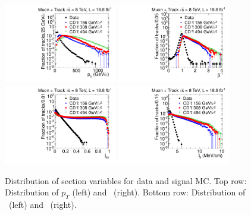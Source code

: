 \begin{figure}
\centering
  \includegraphics[clip=true, trim=0.0cm 0cm 2.8cm 0cm, width=0.44\textwidth]{figures/tkmu/Selection_Comp_8TeV_GMStau_Pt_BS}
  \includegraphics[clip=true, trim=0.0cm 0cm 2.8cm 0cm, width=0.44\textwidth]{figures/tkmu/Selection_Comp_8TeV_GMStau_TOF_BS} \\
  \includegraphics[clip=true, trim=0.0cm 0cm 2.8cm 0cm, width=0.44\textwidth]{figures/tkmu/Selection_Comp_8TeV_GMStau_Is_BS}
  \includegraphics[clip=true, trim=0.0cm 0cm 2.8cm 0cm, width=0.44\textwidth]{figures/tkmu/Selection_Comp_8TeV_GMStau_Im_BS}
  \caption{Distribution of section variables for data and signal MC.
Top row: Distribution of $p_T$ (left) and \invbeta\ (right).
Bottom row: Distribution of \ias\ (left) and \ih\ (right).
    \label{fig:TkMuSelVar}}
\end{figure}

